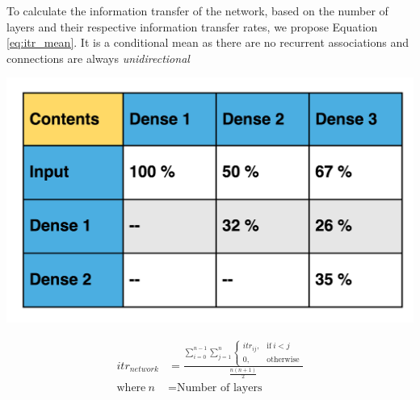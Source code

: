 \documentclass{article}
\begin{document}
To calculate the information transfer of the network, based on the number of layers and their respective information transfer rates, we propose Equation \ref{eq:itr_mean}.  It is a conditional mean as there are no recurrent associations and connections are always \emph{unidirectional}




\noindent\begin{minipage}{.45\textwidth}
   \centering
   \includegraphics[scale=0.13]{paper/SampleTable.png}
   \label{fig:DSC.png}
\end{minipage}
\begin{minipage}{.45\textwidth}
\begin{equation}
\label{eq:itr_mean}
\begin{aligned}
itr_{network} &= \frac{\sum_{i=0}^{n-1}\sum_{j=1}^{n} 
\begin{cases}
  itr_{ij}, & \text{if}\ i<j \\
  0, & \text{otherwise}
\end{cases}}{\frac{n(n+1)}{2}}\\
\text{where}~n &= \text{Number of layers} \\
\end{aligned}
\end{equation}
\end{minipage}
\end{document}
